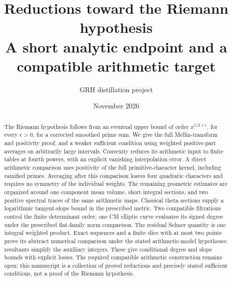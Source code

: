 
\title{Reductions toward the Riemann hypothesis\\
  \large A short analytic endpoint and a compatible arithmetic target}
\author{GRH distillation project}
\date{November 2026}

\maketitle
\begin{abstract}
The Riemann hypothesis follows from an eventual upper bound of order
$x^{1/2+\epsilon}$, for every $\epsilon>0$, for a corrected smoothed
prime sum. We give the full Mellin-transform and positivity proof, and
a weaker sufficient condition using weighted positive-part averages on arbitrarily large
intervals. Convexity reduces its arithmetic input to finite tables at
fourth powers, with an explicit vanishing interpolation error.
A direct arithmetic comparison uses positivity of the full
primitive-character kernel, including ramified primes. Averaging after
this comparison leaves four quadratic characters and requires no symmetry
of the individual weights. The remaining geometric estimates are organized
around one component mean volume, short integral sections, and two
positive spectral traces of the same arithmetic maps. Classical theta
sections supply a logarithmic tangent-slope bound in the prescribed
metric. Two compatible filtrations control the finite determinant order;
one CM elliptic curve evaluates its signed degree under the prescribed
flat-family norm comparison. The residual Selmer quantity is one integral
weighted product. Exact sequences and a finite slice with at most two
points prove its abstract numerical comparison under the stated
arithmetic-model hypotheses; resultants simplify the auxiliary integers.
These give conditional degree and slope bounds with explicit losses. The required compatible
arithmetic construction remains open; this manuscript is a collection of
proved reductions and precisely stated sufficient conditions, not a proof
of the Riemann hypothesis.
\end{abstract}
\setcounter{tocdepth}{1}
\tableofcontents
\clearpage










